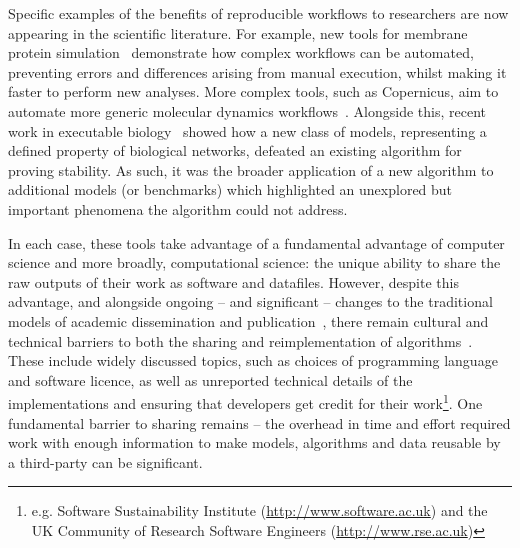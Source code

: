 \documentclass[conference]{IEEEtran}
\begin{document}
Specific examples of the benefits of reproducible workflows to
researchers are now appearing in the scientific literature. For
example, new tools for membrane protein
simulation~\cite{Stansfeld,Hall2014} demonstrate how complex workflows
can be automated, preventing errors and differences arising from
manual execution, whilst making it faster to perform new
analyses. More complex tools, such as Copernicus, aim to automate more
generic molecular dynamics workflows~\cite{Pronk}. Alongside this,
recent work in executable biology~\cite{Cook} showed how a new class
of models, representing a defined property of biological networks,
defeated an existing algorithm for proving stability. As such, it was
the broader application of a new algorithm to additional models (or
benchmarks) which highlighted an unexplored but important phenomena
the algorithm could not address.

In each case, these tools take advantage of a fundamental advantage of
computer science and more broadly, computational science: the unique
ability to share the raw outputs of their work as software and
datafiles. However, despite this advantage, and alongside ongoing --
and significant -- changes to the traditional models of academic
dissemination and
publication~\cite{deroure:2010,stodden-et-al:2013,fursin+dubach:2014},
there remain cultural and technical barriers to both the sharing and
reimplementation of algorithms~\cite{crick-et-al_wssspe2}. These
include widely discussed topics, such as choices of programming
language and software licence, as well as unreported technical details
of the implementations and ensuring that developers get credit for
their work\footnote{e.g. Software Sustainability Institute
(\url{http://www.software.ac.uk}) and the UK Community of Research
Software Engineers (\url{http://www.rse.ac.uk})}. One fundamental
barrier to sharing remains -- the overhead in time and effort required
work with enough information to make models, algorithms and data
reusable by a third-party can be significant.


\end{document}
